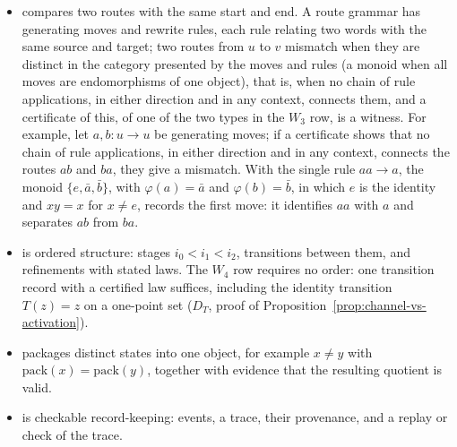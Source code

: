 \begin{itemize}[topsep=2pt,itemsep=1pt]
    unrealizability requires the recorded finite absence certificate, and a
    satisfying realizer yields a \(W_2\) witness only when the comparison
    certifies that the realizer set is not a union
    of \(E\)-classes. If it is such a union, as for the pullback of a
    predicate on packaged states, the comparison fails and there is no \(W_2\)
    witness; the pullback alone does not establish a \(W_5\) witness.
    ``Macro'' refers to the declared status of \(s\), not to definability over
    the quotient: in the satisfying branch the witness certifies that
    realizability of \(s\) is not already decided by the packaging, so the
    \Ptwo{} content is not \Pfive{} content. For example, with the states \(0,1,2,3\) and the packaging \(q\) of the
    running example, the specification \(s(r)\equiv(r=0\lor r=2)\) has realizer
    set \(\{0,2\}\); the \(q\)-class \(\{0,1\}\) meets both \(\{0,2\}\) and its
    complement, so realizability of \(s\) is not decided by \(q\)
    (Proposition~\ref{prop:p2-witness}).
  \item \Pthree{} compares two routes with the same start and end. A route
    grammar has generating moves and rewrite rules, each rule relating two
    words with the same source and target; two routes from \(u\)
    to \(v\) mismatch when they are distinct in the category presented by the
    moves and rules (a monoid when all moves are endomorphisms of one object), that is, when no chain of rule applications, in either
    direction and in any context, connects them,
    and a certificate of this, of one of the two types in the \(W_3\) row, is a
    \Pthree{} witness. For example, let
    \(a,b:u\to u\) be generating moves; if a certificate shows that no
    chain of rule applications, in either direction and in any context,
    connects the routes \(ab\) and
    \(ba\), they give a \Pthree{} mismatch. With the single rule
    \(aa\to a\), the monoid \(\{e,\bar a,\bar b\}\), with \(\varphi(a)=\bar a\) and
    \(\varphi(b)=\bar b\), in which \(e\) is the identity and \(xy=x\) for
    \(x\ne e\), records the first move: it identifies \(aa\) with \(a\) and
    separates \(ab\) from \(ba\).
  \item \Pfour{} is ordered structure: stages \(i_0<i_1<i_2\), transitions
    between them, and refinements with stated laws. The \(W_4\) row requires no order: one transition record with a certified law suffices, including the identity transition \(T(z)=z\) on a one-point set (\(D_T\), proof of Proposition~\ref{prop:channel-vs-activation}).
  \item \Pfive{} packages distinct states into one object, for example
    \(x\ne y\) with \(\mathrm{pack}(x)=\mathrm{pack}(y)\), together with
    evidence that the resulting quotient is valid.
  \item \Psix{} is checkable record-keeping: events, a trace, their
    provenance, and a replay or check of the trace.
\end{itemize}

